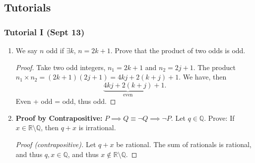 \documentclass[12pt]{article}
\begin{document}
\subsection{Tutorials}
\subsubsection{Tutorial I (Sept 13)}

\begin{enumerate}
  \item We say $n$ odd if $\exists k$, $n = 2k+1$. Prove that the product of two odds is odd.
  \begin{proof}[Proof]
    Take two odd integers, $n_1 = 2k+1$ and $n_2 = 2j+1$. The product $n_1 \times n_2 = (2k+1)(2j+1) = 4kj+2(k+j)+1$. We have, then \[\underbrace{4kj+2(k+j)}_{\text{even}} + 1.\] Even + odd = odd, thus odd.
  \end{proof}

  \item \textbf{Proof by Contrapositive:} $P \implies Q \equiv \neg Q \implies \neg P$. 
  Let $q \in \mathbb{Q}$. Prove: If $x \in \mathbb{R}\setminus\mathbb{Q}$, then $q+x$ is irrational.
  \begin{proof}[Proof (contrapositive)]
    Let $q+x$ be rational. The sum of rationals is rational, and thus $q,x \in \mathbb{Q}$, and thus $x \notin \mathbb{R} \setminus \mathbb{Q}$.
  \end{proof}


\end{enumerate}
\end{document}
